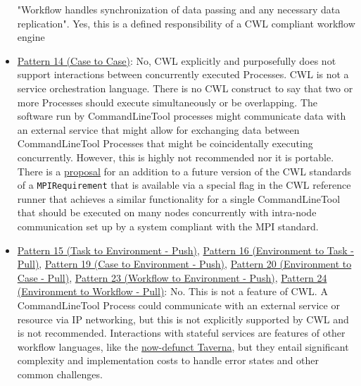 \begin{itemize}
"Workflow handles synchronization of data passing and any necessary data replication". Yes, this is a defined responsibility of a CWL compliant workflow engine

\item \href{http://www.workflowpatterns.com/patterns/data/internal/wdp14.php}{Pattern 14 (Case to Case)}: No, CWL explicitly and purposefully does not support interactions between concurrently executed Processes. CWL is not a service orchestration language. There is no CWL construct to say that two or more Processes should execute simultaneously or be overlapping. The software run by CommandLineTool processes might communicate data with an external service that might allow for exchanging data between CommandLineTool Processes that might be coincidentally executing concurrently. However, this is highly not recommended nor it is portable. There is a \href{https://github.com/common-workflow-language/cwltool#running-mpi-based-tools-that-need-to-be-launched}{proposal} for an addition to a future version of the CWL standards of a \verb|MPIRequirement| that is available via a special flag in the CWL reference runner that achieves a similar functionality for a single CommandLineTool that should be executed on many nodes concurrently with intra-node communication set up by a system compliant with the MPI standard.

\item \href{http://www.workflowpatterns.com/patterns/data/external/wdp15.php}{Pattern 15 (Task to Environment - Push)}, \href{http://www.workflowpatterns.com/patterns/data/external/wdp16.php}{Pattern 16 (Environment to Task - Pull)}, \href{http://www.workflowpatterns.com/patterns/data/external/wdp19.php}{Pattern 19 (Case to Environment - Push)}, \href{http://www.workflowpatterns.com/patterns/data/external/wdp20.php}{Pattern 20 (Environment to Case - Pull)}, \href{http://www.workflowpatterns.com/patterns/data/external/wdp23.php}{Pattern 23 (Workflow to Environment - Push)}, \href{http://www.workflowpatterns.com/patterns/data/external/wdp24.php}{Pattern 24 (Environment to Workflow - Pull)}: No. This is not a feature of CWL. A CommandLineTool Process could communicate with an external service or resource via IP networking, but this is not explicitly supported by CWL and is not recommended. Interactions with stateful services are features of other workflow languages, like the \href{https://lists.apache.org/thread.html/r19322d54fd6aae5778aff46717dea2fbd37c3b64571300ad9cee0191%40%3Cdev.taverna.apache.org%3E}{now-defunct Taverna}, but they entail significant complexity and implementation costs to handle error states and other common challenges.


\end{itemize}
